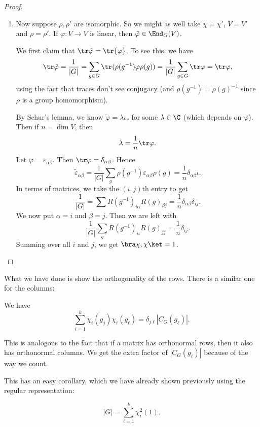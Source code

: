 \documentclass[a4paper]{article}
\begin{document}
\begin{proof}
\begin{enumerate}
    \item Now suppose $\rho, \rho'$ are isomorphic. So we might as well take $\chi = \chi'$, $V = V'$ and $\rho = \rho'$. If $\varphi: V \to V$ is linear, then $\tilde{\varphi} \in \End_G(V)$.

      We first claim that $\tr \tilde{\varphi} = \tr{\varphi}$. To see this, we have
      \[
        \tr \tilde{\varphi} = \frac{1}{|G|} = \sum_{g \in G} \tr(\rho(g^{-1}) \varphi \rho(g)) = \frac{1}{|G|} \sum_{g \in G} \tr \varphi = \tr \varphi,
      \]
      using the fact that traces don't see conjugacy (and $\rho(g^{-1}) = \rho(g)^{-1}$ since $\rho$ is a group homomorphism).

      By Schur's lemma, we know $\tilde{\varphi} = \lambda \iota_v$ for some $\lambda \in \C$ (which depends on $\varphi$). Then if $n = \dim V$, then
      \[
        \lambda = \frac{1}{n} \tr \varphi.
      \]
      Let $\varphi = \varepsilon_{\alpha\beta}$. Then $\tr \varphi = \delta_{\alpha\beta}$. Hence
      \[
        \tilde{\varepsilon}_{\alpha\beta} = \frac{1}{|G|} \sum_g \rho(g^{-1}) \varepsilon_{\alpha\beta}\rho(g) = \frac{1}{n} \delta_{\alpha\beta} \iota.
      \]
      In terms of matrices, we take the $(i, j)$th entry to get
      \[
        \frac{1}{|G|} = \sum R(g^{-1})_{i\alpha} R(g)_{\beta j} = \frac{1}{n} \delta_{\alpha\beta} \delta_{ij}.
      \]
      We now put $\alpha = i$ and $\beta = j$. Then we are left with
      \[
        \frac{1}{|G|} \sum_g R(g^{-1})_{ii} R(g)_{jj} = \frac{1}{n} \delta_{ij}.
      \]
      Summing over all $i$ and $j$, we get $\bra \chi, \chi \ket = 1$.
  \end{enumerate}
\end{proof}

What we have done is show the orthogonality of the rows. There is a similar one for the columns:

\begin{thm}
  We have
  \[
    \sum_{i = 1}^k \overline{\chi_i (g_j)}\chi_i (g_\ell) = \delta_{j\ell} |C_G(g_\ell)|.
  \]
\end{thm}
This is analogous to the fact that if a matrix has orthonormal rows, then it also has orthonormal columns. We get the extra factor of $|C_G(g_\ell)|$ because of the way we count.

This has an easy corollary, which we have already shown previously using the regular representation:
\begin{cor}
  \[
    |G| = \sum_{i = 1}^k \chi_i^2 (1).
  \]
\end{cor}
\end{document}
